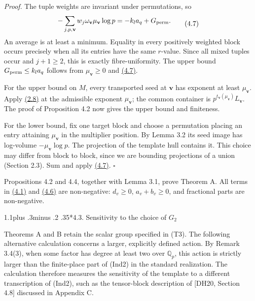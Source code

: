 \documentclass[11pt,a4paper]{amsart}
\makeatletter
\renewcommand\subsection{\@startsection{subsection}{2}{\z@}
{1.1\baselineskip plus .3\baselineskip minus .2\baselineskip}
{.35\baselineskip}{\normalfont\bfseries}}
\makeatother
\begin{document}
\emph{Proof.} The tuple weights are invariant under permutations, so
\begin{equation}
\begin{gathered}
-\sum_{j,p,\mathbf v}w_j\omega_{\mathbf v}\mu_{\mathbf v}\log p
=-k_la_q+G_{\rm perm}.
\end{gathered}
\tag{4.7}\label{eq:4.7}
\end{equation}
An average is at least a minimum. Equality in every positively weighted block occurs precisely when all its entries have the same $r$-value. Since all mixed tuples occur and $j+1\ge2$, this is exactly fibre-uniformity. The upper bound $G_{\rm perm}\le k_la_q$ follows from $\mu_{\mathbf v}\ge0$ and \hyperref[eq:4.7]{(4.7)}.


For the upper bound on $M$, every transported seed at $\mathbf v$ has exponent at least $\mu_{\mathbf v}$. Apply \hyperref[eq:2.8]{(2.8)} at the admissible exponent $\mu_{\mathbf v}$; the common container is $p^{t_{\mathbf v}(\mu_{\mathbf v})}L_{\mathbf v}$. The proof of Proposition 4.2 now gives the upper bound and finiteness.


For the lower bound, fix one target block and choose a permutation placing an entry attaining $\mu_{\mathbf v}$ in the multiplier position. By Lemma 3.2 its seed image has log-volume $-\mu_{\mathbf v}\log p$. The projection of the template hull contains it. This choice may differ from block to block, since we are bounding projections of a union (Section 2.3). Sum and apply \hyperref[eq:4.7]{(4.7)}. \hfill$\square$


Propositions 4.2 and 4.4, together with Lemma 3.1, prove Theorem A. All terms in \hyperref[eq:4.1]{(4.1)} and \hyperref[eq:4.6]{(4.6)} are non-negative: $d_v\ge0$, $a_v+b_v\ge0$, and fractional parts are non-negative.


\Needspace{180pt}\subsection*{4.3. Sensitivity to the choice of $G_2$}

Theorems A and B retain the scalar group specified in (T3). The following alternative calculation concerns a larger, explicitly defined action. By Remark 3.4(3), when some factor has degree at least two over $\mathbb Q_p$, this action is strictly larger than the finite-place part of (Ind2) in the standard realization. The calculation therefore measures the sensitivity of the template to a different transcription of (Ind2), such as the tensor-block description of [DH20, Section 4.8] discussed in Appendix C.
\end{document}
